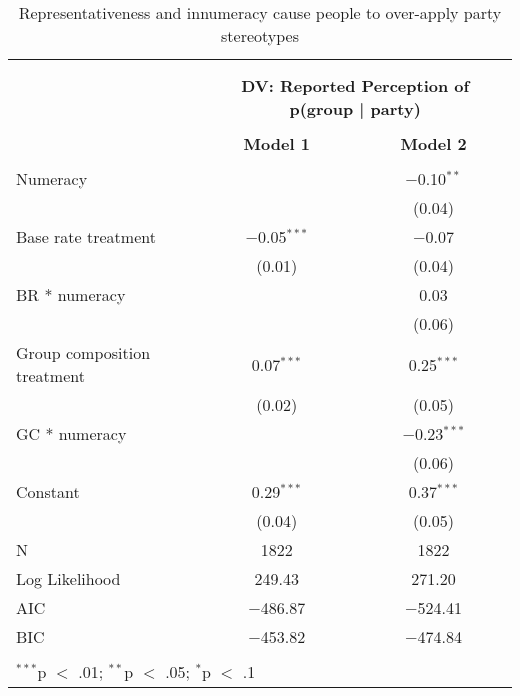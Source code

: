 
\begin{table}[!htbp] \centering 
  \caption{Representativeness and innumeracy cause people to over-apply party stereotypes} 
  \label{tab:representativeness} 
\begin{tabular}{@{\extracolsep{5pt}}lcc} 
\\[-1.8ex]\hline \\[-1.8ex] 
\\[-1.8ex] & \multicolumn{2}{c}{\textbf{DV: Reported Perception of p(group | party)}} \\ 
\\[-1.8ex] & \textbf{Model 1} & \textbf{Model 2}\\ 
\hline \\[-1.8ex] 
 Numeracy &  & $-$0.10$^{**}$ \\ 
  &  & (0.04) \\ 
  Base rate treatment & $-$0.05$^{***}$ & $-$0.07 \\ 
  & (0.01) & (0.04) \\ 
  BR * numeracy &  & 0.03 \\ 
  &  & (0.06) \\ 
  Group composition treatment & 0.07$^{***}$ & 0.25$^{***}$ \\ 
  & (0.02) & (0.05) \\ 
  GC * numeracy &  & $-$0.23$^{***}$ \\ 
  &  & (0.06) \\ 
  Constant & 0.29$^{***}$ & 0.37$^{***}$ \\ 
  & (0.04) & (0.05) \\ 
 N & 1822 & 1822 \\ 
Log Likelihood & 249.43 & 271.20 \\ 
AIC & $-$486.87 & $-$524.41 \\ 
BIC & $-$453.82 & $-$474.84 \\ 
\hline \\[-1.8ex] 
\multicolumn{3}{l}{$^{***}$p $<$ .01; $^{**}$p $<$ .05; $^{*}$p $<$ .1} \\ 
\end{tabular} 
\end{table} 
